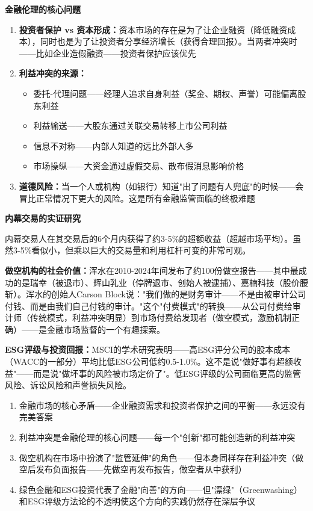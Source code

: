 \documentclass[a4paper,11pt]{ctexbook}
\begin{document}
\begin{qualitative}
\textbf{金融伦理的核心问题}

\begin{enumerate}
  \item \textbf{投资者保护 vs 资本形成：}资本市场的存在是为了让企业融资（降低融资成本），同时也是为了让投资者分享经济增长（获得合理回报）。当两者冲突时——比如企业造假融资——投资者保护应该优先
  \item \textbf{利益冲突的来源：}
  \begin{itemize}
    \item 委托-代理问题——经理人追求自身利益（奖金、期权、声誉）可能偏离股东利益
    \item 利益输送——大股东通过关联交易转移上市公司利益
    \item 信息不对称——内部人知道的远比外部人多
    \item 市场操纵——大资金通过虚假交易、散布假消息影响价格
  \end{itemize}
  \item \textbf{道德风险：}当一个人或机构（如银行）知道"出了问题有人兜底"的时候——会冒比正常情况下更大的风险。这是所有金融监管面临的终极难题
\end{enumerate}
\end{qualitative}

\begin{quantitative}
\textbf{内幕交易的实证研究}

内幕交易人在其交易后的6个月内获得了约3-5\%的超额收益（超越市场平均）。虽然3-5\%看似小，但乘以巨大的交易量和利用杠杆可变的非常可观。

\textbf{做空机构的社会价值：}浑水在2010-2024年间发布了约100份做空报告——其中最成功的是瑞幸（被退市）、辉山乳业（停牌退市、创始人被逮捕）、嘉楠科技（股价腰斩）。浑水的创始人Carson Block说："我们做的是财务审计——不是由被审计公司付钱、而是由我们自己付钱的审计。"这个"付费模式"的转换——从公司付费给审计师（传统模式，利益冲突明显）到市场付费给发现者（做空模式，激励机制正确）——是金融市场监督的一个有趣探索。

\textbf{ESG评级与投资回报：}MSCI的学术研究表明——高ESG评分公司的股本成本（WACC的一部分）平均比低ESG公司低约0.5-1.0\%。这不是说"做好事有超额收益"——而是说"做坏事的风险被市场定价了"。低ESG评级的公司面临更高的监管风险、诉讼风险和声誉损失风险。
\end{quantitative}

\begin{lessonsummary}
\begin{enumerate}
  \item 金融市场的核心矛盾——企业融资需求和投资者保护之间的平衡——永远没有完美答案
  \item 利益冲突是金融伦理的核心问题——每一个"创新"都可能创造新的利益冲突
  \item 做空机构在市场中扮演了"监管延伸"的角色——但本身同样存在利益冲突（做空后发布负面报告——先做空再发布报告，做空者从中获利）
  \item 绿色金融和ESG投资代表了金融"向善"的方向——但"漂绿"（Greenwashing）和ESG评级方法论的不透明使这个方向的实践仍然存在深层争议
\end{enumerate}
\end{lessonsummary}
\end{document}
